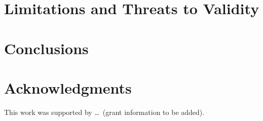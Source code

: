 \documentclass[final,5p,numbers]{elsarticle}
\begin{document}
\section{Limitations and Threats to Validity}
\label{sec:limitations}


\section{Conclusions}
\label{sec:concl}


\clearpage

\clearpage

\section*{Acknowledgments}
This work was supported by \ldots\ (grant information to be added).



\end{document}
